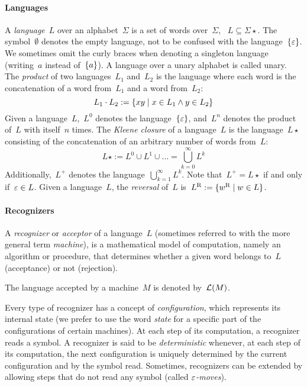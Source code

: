 \paragraph{Languages} A \emph{language}~$L$ over an alphabet~$\Sigma$ is a set of words over~$\Sigma$, \ie~$L\subseteq\Sigma\star$.
The symbol~$\emptyset$ denotes the empty language, not to be confused with the language~$\{\varepsilon\}$.
We sometimes omit the curly braces when denoting a singleton language (writing~$a$ instead of~$\{a\}$).%
A language over a unary alphabet is called unary.
The \emph{product} of two languages~$L_1$ and~$L_2$ is the language where each word is the concatenation of a word from~$L_1$ and a word from~$L_2$: \begin{equation*} L_1\cdot L_2 := \{xy\mid x\in L_1 \land y\in L_2\} \end{equation*} Given a language~$L$,~$L^0$ denotes the language~$\{\varepsilon\}$, and~$L^n$ denotes the product of~$L$ with itself~$n$ times.
The \emph{Kleene closure} of a language~$L$ is the language~$L\star$ consisting of the concatenation of an arbitrary number of words from~$L$: \begin{equation*} L\star := L^0\cup L^1\cup\dots=\bigcup_{k=0}^\infty L^k \end{equation*} Additionally,~$L^+$ denotes the language~$\bigcup_{k=1}^\infty L^k$.
Note that~$L^+=L\star$ if and only if~$\varepsilon\in L$.
Given a language~$L$, the \emph{reversal} of~$L$ is~$L^{\mathrm R}:=\{w^{\mathrm R} \mid w\in L\}$.

\paragraph{Recognizers} A \emph{recognizer} or \emph{acceptor} of a language~$L$ (sometimes referred to with the more general term \emph{machine}), is a mathematical model of computation, namely an algorithm or procedure, that determines whether a given word belongs to~$L$ (acceptance) or not (rejection).

The language accepted by a machine~$M$ is denoted by~$\mathcal L(M)$.

Every type of recognizer has a concept of \emph{configuration}, which represents its internal state (we prefer to use the word \emph{state} for a specific part of the configurations of certain machines).
At each step of its computation, a recognizer reads a symbol.
A recognizer is said to be \emph{deterministic} whenever, at each step of its computation, the next configuration is uniquely determined by the current configuration and by the symbol read.
Sometimes, recognizers can be extended by allowing steps that do not read any symbol (called \emph{$\varepsilon$-moves}).



